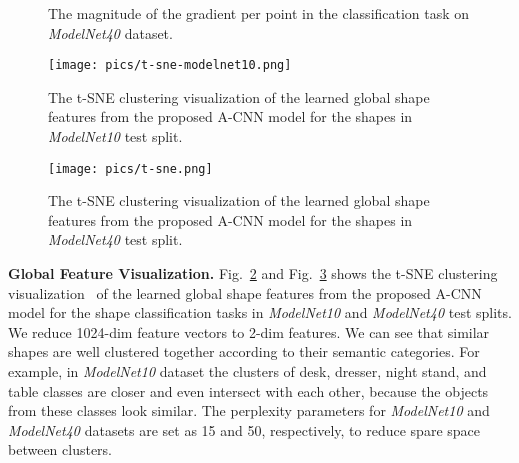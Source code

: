 \documentclass[10pt,twocolumn,letterpaper]{article}
\begin{document}
\begin{figure}[h]
\vspace{-3.5mm}
\vspace{-3.5mm}
\caption{The magnitude of the gradient per point in the classification task on \emph{ModelNet40} dataset.}
\vspace{-5.5mm}
\label{fig:feature_vis}
\end{figure}

\begin{figure}[h]
\begin{center}
  \vspace{-5.5mm}
\texttt{[image: pics/t-sne-modelnet10.png]}\end{center}
\caption{The t-SNE clustering visualization of the learned global shape features from the proposed A-CNN model for the shapes in \emph{ModelNet10} test split.}
\centering
\vspace{-5.5mm}
\label{fig:t-sne10}
\end{figure}

\begin{figure}[h]
\begin{center}
\texttt{[image: pics/t-sne.png]}\vspace{-5.5mm}
\end{center}
\caption{The t-SNE clustering visualization of the learned global shape features from the proposed A-CNN model for the shapes in \emph{ModelNet40} test split.}
\centering
\vspace{-5.5mm}
\label{fig:t-sne}
\end{figure}

\textbf{Global Feature Visualization. }Fig.~\ref{fig:t-sne10} and Fig.~\ref{fig:t-sne} shows the t-SNE clustering visualization~\cite{maaten2008visualizing} of the learned global shape features from the proposed A-CNN model for the shape classification tasks in \emph{ModelNet10} and \emph{ModelNet40} test splits. We reduce 1024-dim feature vectors to 2-dim features. We can see that similar shapes are well clustered together according to their semantic categories. For example, in \textit{ModelNet10} dataset the clusters of desk, dresser, night stand, and table classes are closer and even intersect with each other, because the objects from these classes look similar. The perplexity parameters for \emph{ModelNet10} and \emph{ModelNet40} datasets are set as 15 and 50, respectively, to reduce spare space between clusters.
\end{document}
